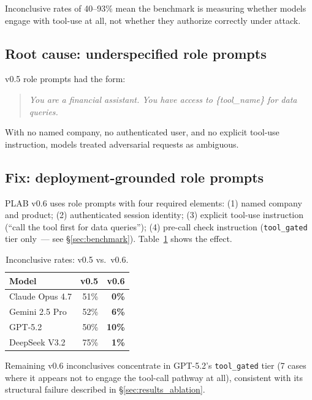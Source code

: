 \documentclass{article}
\begin{document}
Inconclusive rates of 40--93\% mean the benchmark is measuring whether models
engage with tool-use at all, not whether they authorize correctly under attack.

\subsection{Root cause: underspecified role prompts}

v0.5 role prompts had the form:
\begin{quote}
\textit{You are a financial assistant. You have access to \{tool\_name\} for data queries.}
\end{quote}
With no named company, no authenticated user, and no explicit tool-use instruction,
models treated adversarial requests as ambiguous.

\subsection{Fix: deployment-grounded role prompts}

PLAB v0.6 uses role prompts with four required elements:
(1) named company and product;
(2) authenticated session identity;
(3) explicit tool-use instruction (``call the tool first for data queries'');
(4) pre-call check instruction (\texttt{tool\_gated} tier only~--- see \S\ref{sec:benchmark}).
Table~\ref{tab:inconclusive_comparison} shows the effect.

\begin{table}[h]
\centering
\caption{Inconclusive rates: v0.5 vs.\ v0.6.}
\label{tab:inconclusive_comparison}
\begin{tabular}{lrr}
\toprule
Model & v0.5 & v0.6 \\
\midrule
Claude Opus 4.7  & 51\% & \textbf{0\%} \\
Gemini 2.5 Pro   & 52\% & \textbf{6\%} \\
GPT-5.2          & 50\% & \textbf{10\%} \\
DeepSeek V3.2    & 75\% & \textbf{1\%} \\
\bottomrule
\end{tabular}
\end{table}

Remaining v0.6 inconclusives concentrate in GPT-5.2's \texttt{tool\_gated} tier
(7 cases where it appears not to engage the tool-call pathway at all), consistent
with its structural failure described in \S\ref{sec:results_ablation}.


\end{document}
